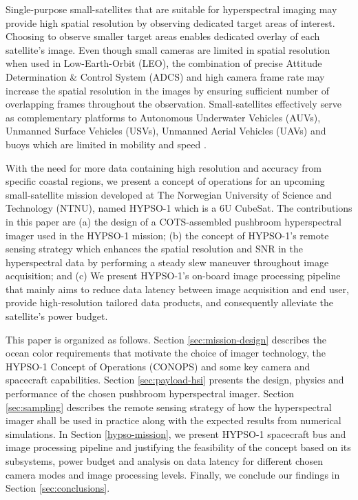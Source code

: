 Single-purpose small-satellites that are suitable for hyperspectral imaging may provide high spatial resolution by observing dedicated target areas of interest. Choosing to observe smaller target areas enables dedicated overlay of each satellite's image. Even though small cameras are limited in spatial resolution when used in Low-Earth-Orbit (LEO), the combination of precise Attitude Determination \& Control System (ADCS) and high camera frame rate may increase the spatial resolution in the images by ensuring sufficient number of overlapping frames throughout the observation. Small-satellites effectively serve as complementary platforms to Autonomous Underwater Vehicles (AUVs), Unmanned Surface Vehicles (USVs), Unmanned Aerial Vehicles (UAVs) and buoys which are limited in mobility and speed \cite{Dic05}. 

With the need for more data containing high resolution and accuracy from specific coastal regions, we present a concept of operations for an upcoming small-satellite mission developed at The Norwegian University of Science and Technology (NTNU), named HYPSO-1 which is a 6U CubeSat. The contributions in this paper are (a) the design of a COTS-assembled pushbroom hyperspectral imager used in the HYPSO-1 mission; (b) the concept of HYPSO-1's remote sensing strategy which enhances the spatial resolution and SNR in the hyperspectral data by performing a steady slew maneuver throughout image acquisition; and (c) We present HYPSO-1's on-board image processing pipeline that mainly aims to reduce data latency between image acquisition and end user, provide high-resolution tailored data products, and consequently alleviate the satellite's power budget. 

This paper is organized as follows. Section \ref{sec:mission-design} describes the ocean color requirements that motivate the choice of imager technology, the HYPSO-1 Concept of Operations (CONOPS) and some key camera and spacecraft capabilities. Section \ref{sec:payload-hsi} presents the design, physics and performance of the chosen pushbroom hyperspectral imager. Section \ref{sec:sampling} describes the remote sensing strategy of how the hyperspectral imager shall be used in practice along with the expected results from numerical simulations. In Section \ref{hypso-mission}, we present HYPSO-1 spacecraft bus and image processing pipeline and justifying the feasibility of the concept based on its subsystems, power budget and analysis on data latency for different chosen camera modes and image processing levels. Finally, we conclude our findings in Section \ref{sec:conclusions}.